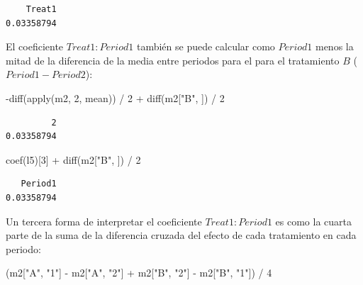 \documentclass[
  12pt,
  a4paper,
  extrafontsizes,
  onecolumn,
  openright,
  table]{memoir}
\newenvironment{Shaded}{\begin{snugshade}}{\end{snugshade}}
\newcommand{\DecValTok}[1]{\textcolor[rgb]{0.68,0.00,0.00}{#1}}
\newcommand{\FunctionTok}[1]{\textcolor[rgb]{0.28,0.35,0.67}{#1}}
\newcommand{\NormalTok}[1]{\textcolor[rgb]{0.00,0.23,0.31}{#1}}
\newcommand{\SpecialCharTok}[1]{\textcolor[rgb]{0.37,0.37,0.37}{#1}}
\newcommand{\StringTok}[1]{\textcolor[rgb]{0.13,0.47,0.30}{#1}}
\begin{document}
\begin{verbatim}
    Treat1 
0.03358794 
\end{verbatim}

\normalsize

El coeficiente \(Treat1:Period1\) también se puede calcular como
\(Period1\) menos la mitad de la diferencia de la media entre periodos
para el para el tratamiento \(B\) (\(Period1-Period2\)):

\scriptsize

\begin{Shaded}
\begin{Highlighting}[]
\SpecialCharTok{{-}}\FunctionTok{diff}\NormalTok{(}\FunctionTok{apply}\NormalTok{(m2, }\DecValTok{2}\NormalTok{, mean)) }\SpecialCharTok{/} \DecValTok{2} \SpecialCharTok{+} \FunctionTok{diff}\NormalTok{(m2[}\StringTok{"B"}\NormalTok{, ]) }\SpecialCharTok{/} \DecValTok{2}
\end{Highlighting}
\end{Shaded}

\begin{verbatim}
         2 
0.03358794 
\end{verbatim}

\begin{Shaded}
\begin{Highlighting}[]
\FunctionTok{coef}\NormalTok{(l5)[}\DecValTok{3}\NormalTok{] }\SpecialCharTok{+} \FunctionTok{diff}\NormalTok{(m2[}\StringTok{"B"}\NormalTok{, ]) }\SpecialCharTok{/} \DecValTok{2}
\end{Highlighting}
\end{Shaded}

\begin{verbatim}
   Period1 
0.03358794 
\end{verbatim}

\normalsize

Un tercera forma de interpretar el coeficiente \(Treat1:Period1\) es
como la cuarta parte de la suma de la diferencia cruzada del efecto de
cada tratamiento en cada periodo:

\scriptsize

\begin{Shaded}
\begin{Highlighting}[]
\NormalTok{(m2[}\StringTok{"A"}\NormalTok{, }\StringTok{"1"}\NormalTok{] }\SpecialCharTok{{-}}\NormalTok{ m2[}\StringTok{"A"}\NormalTok{, }\StringTok{"2"}\NormalTok{] }\SpecialCharTok{+}\NormalTok{ m2[}\StringTok{"B"}\NormalTok{, }\StringTok{"2"}\NormalTok{] }\SpecialCharTok{{-}}\NormalTok{ m2[}\StringTok{"B"}\NormalTok{, }\StringTok{"1"}\NormalTok{]) }\SpecialCharTok{/} \DecValTok{4}
\end{Highlighting}
\end{Shaded}
\end{document}
